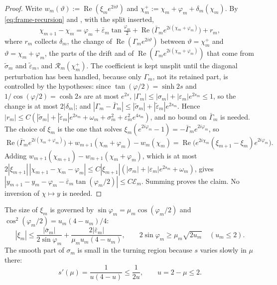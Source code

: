 \begin{proof}
Write $w_m(\vartheta):=\operatorname{Re}(\xi_me^{2i\vartheta})$ and
$\chi^+_m:=\chi_m+\varphi_m+\delta_m(\chi_m)$. By \eqref{eq:frame-recursion} and
, with the split inserted,
\[
  \chi_{m+1}-\chi_m=\varphi_m+\bar\varepsilon_m\tan\tfrac{\varphi_m}2
  +\operatorname{Re}\bigl(\bar\Gamma_me^{2i(\chi_m+\varphi_m)}\bigr)+r_m,
\]
where $r_m$ collects $\delta_m$, the change of $\operatorname{Re}(\Gamma_me^{2i\vartheta})$ between
$\vartheta=\chi^+_m$ and $\vartheta=\chi_m+\varphi_m$, the parts of the drift and of
$\operatorname{Re}(\Gamma_me^{2i(\chi_m+\varphi_m)})$ that come from $\tilde\sigma_m$ and
$\tilde\varepsilon_m$, and $\mathcal R_m(\chi^+_m)$. The coefficient is kept unsplit until the diagonal
perturbation has been handled, because only $\Gamma_m$, not its retained part, is controlled by the
hypotheses: since $\tan(\varphi/2)=\sinh2s$ and $1/\cos(\varphi/2)=\cosh2s$ are at most $e^{2s}$,
$|\Gamma_m|\le|\sigma_m|+|\varepsilon_m|e^{2s_m}\le1$, so the change is at most $2|\delta_m|$; and
$|\Gamma_m-\bar\Gamma_m|\le|\tilde\sigma_m|+|\tilde\varepsilon_m|e^{2s_m}$. Hence
$|r_m|\le C(|\tilde\sigma_m|+|\tilde\varepsilon_m|e^{2s_m}+\omega_m+\sigma_m^2+\varepsilon_m^2e^{4s_m})$, and no
bound on $\bar\Gamma_m$ is needed.
The choice of $\xi_m$ is the one that solves $\xi_m(e^{2i\varphi_m}-1)=-\bar\Gamma_me^{2i\varphi_m}$,
so
\[
  \operatorname{Re}\bigl(\bar\Gamma_me^{2i(\chi_m+\varphi_m)}\bigr)
  +w_{m+1}(\chi_m+\varphi_m)-w_m(\chi_m)
  =\operatorname{Re}\bigl(e^{2i\chi_m}(\xi_{m+1}-\xi_m)e^{2i\varphi_m}\bigr).
\]
Adding $w_{m+1}(\chi_{m+1})-w_{m+1}(\chi_m+\varphi_m)$, which is at most
$2|\xi_{m+1}|\,|\chi_{m+1}-\chi_m-\varphi_m|\le C|\xi_{m+1}|(|\sigma_m|+|\varepsilon_m|e^{2s_m}+\omega_m)$,
gives $|y_{m+1}-y_m-\varphi_m-\bar\varepsilon_m\tan(\varphi_m/2)|\le C\mathcal E_m$. Summing
proves the claim. No inversion of $\chi\mapsto y$ is needed.
\end{proof}

The size of $\xi_m$ is governed by $\sin\varphi_m=\mu_m\cos(\varphi_m/2)$ and
$\cos^2(\varphi_m/2)=u_m(4-u_m)/4$:
\begin{equation}\label{eq:xi-size}
  |\xi_m|\le\frac{|\bar\sigma_m|}{2\sin\varphi_m}+\frac{2|\bar\varepsilon_m|}{\mu_mu_m(4-u_m)},
  \qquad 2\sin\varphi_m\ge\mu_m\sqrt{2u_m}\quad(u_m\le2).
\end{equation}
The smooth part of $\sigma_m$ is small in the turning region because $s$ varies slowly
in $\mu$ there:
\begin{equation}\label{eq:sprime}
  s'(\mu)=\frac{1}{u(4-u)}\le\frac1{2u},\qquad u=2-\mu\le2.
\end{equation}
